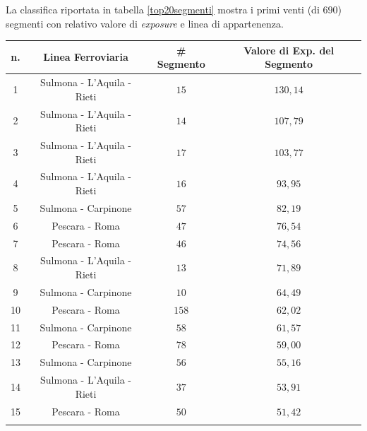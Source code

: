 La classifica riportata in tabella \ref{top20segmenti} mostra i primi venti (di $690$) segmenti con relativo valore di \textit{exposure} e linea di appartenenza.
\begin{table}[h]
\centering
\begin{tabular}{|c|c|c|c|}
\hline
\rowcolor{lightgray}
n. & Linea Ferroviaria          & \# Segmento & Valore di Exp. del Segmento \\ \hline \rowcolor{flamingopink}
1  & Sulmona - L'Aquila - Rieti & $15$        & $130,14$                    \\ \hline \rowcolor{flamingopink}
2  & Sulmona - L'Aquila - Rieti & $14$        & $107,79$                    \\ \hline \rowcolor{flamingopink}
3  & Sulmona - L'Aquila - Rieti & $17$        & $103,77$                    \\ \hline \rowcolor{flamingopink}
4  & Sulmona - L'Aquila - Rieti & $16$        & $93,95$                     \\ \hline \rowcolor{flamingopink}
5  & Sulmona - Carpinone        & $57$        & $82,19$                     \\ \hline \rowcolor{flamingopink}
6  & Pescara - Roma             & $47$        & $76,54$                     \\ \hline \rowcolor{flamingopink}
7  & Pescara - Roma             & $46$        & $74,56$                     \\ \hline \rowcolor{flamingopink}
8  & Sulmona - L'Aquila - Rieti & $13$        & $71,89$                     \\ \hline \rowcolor{flamingopink}
9  & Sulmona - Carpinone        & $10$        & $64,49$                     \\ \hline \rowcolor{flamingopink}
10 & Pescara - Roma             & $158$       & $62,02$                     \\ \hline \rowcolor{flamingopink}
11 & Sulmona - Carpinone        & $58$        & $61,57$                     \\ \hline \rowcolor{flamingopink}
12 & Pescara - Roma             & $78$        & $59,00$                     \\ \hline \rowcolor{flamingopink}
13 & Sulmona - Carpinone        & $56$        & $55,16$                     \\ \hline \rowcolor{flamingopink}
14 & Sulmona - L'Aquila - Rieti & $37$        & $53,91$                     \\ \hline \rowcolor{flamingopink}
15 & Pescara - Roma             & $50$        & $51,42$                     \\ \hline \rowcolor{flamingopink}

\end{tabular}
\end{table}
